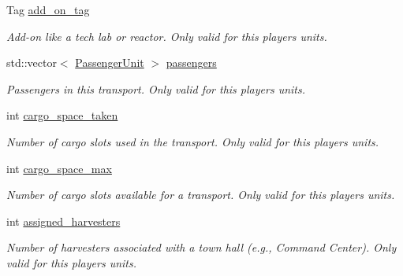 \begin{DoxyCompactItemize}
Tag \hyperlink{classsc2_1_1_unit_a01b13cf74f1851983a834fdbf3e22b8a}{add\+\_\+on\+\_\+tag}
\begin{DoxyCompactList}\small\item\em Add-\/on like a tech lab or reactor. Only valid for this player\textquotesingle{}s units. \end{DoxyCompactList}\item 
\mbox{\label{classsc2_1_1_unit_a01e2249c0d1bd27d8b61f233fbd75b66}} 
std\+::vector$<$ \hyperlink{structsc2_1_1_passenger_unit}{Passenger\+Unit} $>$ \hyperlink{classsc2_1_1_unit_a01e2249c0d1bd27d8b61f233fbd75b66}{passengers}
\begin{DoxyCompactList}\small\item\em Passengers in this transport. Only valid for this player\textquotesingle{}s units. \end{DoxyCompactList}\item 
\mbox{\label{classsc2_1_1_unit_a59fb99084581bf4871a7de173931fc79}} 
int \hyperlink{classsc2_1_1_unit_a59fb99084581bf4871a7de173931fc79}{cargo\+\_\+space\+\_\+taken}
\begin{DoxyCompactList}\small\item\em Number of cargo slots used in the transport. Only valid for this player\textquotesingle{}s units. \end{DoxyCompactList}\item 
\mbox{\label{classsc2_1_1_unit_ab5dfd5b0c6f27a8a1f89b372260d9fb2}} 
int \hyperlink{classsc2_1_1_unit_ab5dfd5b0c6f27a8a1f89b372260d9fb2}{cargo\+\_\+space\+\_\+max}
\begin{DoxyCompactList}\small\item\em Number of cargo slots available for a transport. Only valid for this player\textquotesingle{}s units. \end{DoxyCompactList}\item 
\mbox{\label{classsc2_1_1_unit_aca42babe7fa2542782783a825fb99522}} 
int \hyperlink{classsc2_1_1_unit_aca42babe7fa2542782783a825fb99522}{assigned\+\_\+harvesters}
\begin{DoxyCompactList}\small\item\em Number of harvesters associated with a town hall (e.\+g., Command Center). Only valid for this player\textquotesingle{}s units. \end{DoxyCompactList}\item 

\end{DoxyCompactItemize}
